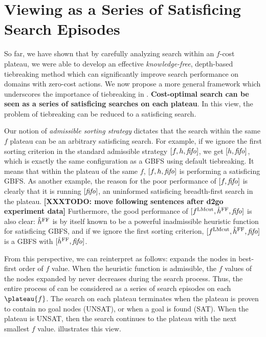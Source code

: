 \clearpage 
\section{Viewing \astar as a Series of Satisficing Search Episodes}
\label{sec:discussion}

So far, we have shown that by carefully analyzing search within an $f$-cost plateau,
we were able to develop an effective
{\it knowledge-free}, depth-based tiebreaking method which can significantly improve search performance on domains with zero-cost actions.
We now propose a more general framework which underscores the importance of tiebreaking in \astar.
\textbf{Cost-optimal search
can be seen as a series of satisficing searches on each plateau}. In this view, the problem of tiebreaking can be
reduced to a satisficing search.

Our notion of \emph{admissible sorting strategy} dictates that the
search within the same $f$ plateau can be an arbitrary satisficing search. For example,
if we ignore the first sorting criterion in the standard admissible strategy
$[f,h,{\text{\textit{fifo}}}]$, we get $[h,{\text{\textit{fifo}}}]$, which is exactly
the same configuration as a GBFS using \fifo default tiebreaking. It
means that within the plateau of the same $f$, $[f,h,{\text{\textit{fifo}}}]$ is
performing a satisficing GBFS.
As another example, the reason for the poor performance of $[f,{\text{\textit{fifo}}}]$
is clearly that it is running $[{\text{\textit{fifo}}}]$,
an uninformed satisficing breadth-first search in the plateau.
{\bf [XXXTODO: move following sentences after d2go experiment data] }
Furthermore, the good performance of $[f^{\text{LMcut}},\hat{h}^{\text{FF}},{\text{\textit{fifo}}}]$ is also clear:
$\hat{h}^{\text{FF}}$ is by itself known to be a powerful inadmissible heuristic  %
function for satisficing GBFS, and 
if we ignore the first sorting criterion, $[f^{\text{LMcut}},\hat{h}^{\text{FF}},{\text{\textit{fifo}}}]$ is a GBFS with $[\hat{h}^{\text{FF}},{\text{\textit{fifo}}}]$.

From this perspective, we can reinterpret \astar as follows: \astar expands the nodes in best-first order of $f$ value. When the
heuristic function is admissible, the $f$ values of the nodes expanded by \astar never decreases during the
search process.
Thus, the entire process of \astar can be considered as a series of search episodes on each $\plateau{f}$.
The search on each plateau terminates when the plateau is proven to contain no goal nodes (UNSAT), or when a goal is found (SAT).
When the plateau is UNSAT, then the search continues to the plateau with the next smallest $f$ value.
 illustrates this view.


